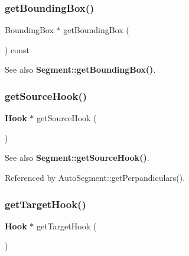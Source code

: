 \subsubsection{\texorpdfstring{get\+Bounding\+Box()}{getBoundingBox()}}
{\footnotesize\ttfamily Bounding\+Box $\ast$ get\+Bounding\+Box (\begin{DoxyParamCaption}{ }\end{DoxyParamCaption}) const\hspace{0.3cm}{\ttfamily [inline]}}

\begin{DoxySeeAlso}{See also}
\textbf{ Segment\+::get\+Bounding\+Box()}. 
\end{DoxySeeAlso}
\mbox{\label{classKatabatic_1_1AutoSegment_a1defbbaef0a1975993e157a8d5f68ded}} 
\subsubsection{\texorpdfstring{get\+Source\+Hook()}{getSourceHook()}}
{\footnotesize\ttfamily \textbf{ Hook} $\ast$ get\+Source\+Hook (\begin{DoxyParamCaption}{ }\end{DoxyParamCaption})\hspace{0.3cm}{\ttfamily [inline]}}

\begin{DoxySeeAlso}{See also}
\textbf{ Segment\+::get\+Source\+Hook()}. 
\end{DoxySeeAlso}


Referenced by Auto\+Segment\+::get\+Perpandiculars().

\mbox{\label{classKatabatic_1_1AutoSegment_ad62048f68151e5db987b5a7c79cce4ed}} 
\subsubsection{\texorpdfstring{get\+Target\+Hook()}{getTargetHook()}}
{\footnotesize\ttfamily \textbf{ Hook} $\ast$ get\+Target\+Hook (\begin{DoxyParamCaption}{ }\end{DoxyParamCaption})\hspace{0.3cm}{\ttfamily [inline]}}

